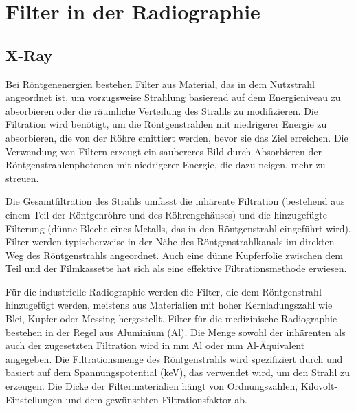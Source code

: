 \section{Filter in der Radiographie}
\subsection{X-Ray}

Bei Röntgenenergien bestehen Filter aus Material, das in dem Nutzstrahl angeordnet ist, um vorzugsweise Strahlung basierend auf dem Energieniveau zu absorbieren oder die räumliche Verteilung des Strahls zu modifizieren. Die Filtration wird benötigt, um die Röntgenstrahlen mit niedrigerer Energie zu absorbieren, die von der Röhre emittiert werden, bevor sie das Ziel erreichen. Die Verwendung von Filtern erzeugt ein saubereres Bild durch Absorbieren der Röntgenstrahlenphotonen mit niedrigerer Energie, die dazu neigen, mehr zu streuen.

Die Gesamtfiltration des Strahls umfasst die inhärente Filtration (bestehend aus einem Teil der Röntgenröhre und des Röhrengehäuses) und die hinzugefügte Filterung (dünne Bleche eines Metalls, das in den Röntgenstrahl eingeführt wird). Filter werden typischerweise in der Nähe des Röntgenstrahlkanals im direkten Weg des Röntgenstrahls angeordnet. Auch eine dünne Kupferfolie zwischen dem Teil und der Filmkassette hat sich als eine effektive Filtrationsmethode erwiesen.

Für die industrielle Radiographie werden die Filter, die dem Röntgenstrahl hinzugefügt werden, meistens aus Materialien mit hoher Kernladungszahl wie Blei, Kupfer oder Messing hergestellt. Filter für die medizinische Radiographie bestehen in der Regel aus Aluminium (Al). Die Menge sowohl der inhärenten als auch der zugesetzten Filtration wird in mm Al oder mm Al-Äquivalent angegeben. Die Filtrationsmenge des Röntgenstrahls wird spezifiziert durch und basiert auf dem Spannungspotential (keV), das verwendet wird, um den Strahl zu erzeugen. Die Dicke der Filtermaterialien hängt von Ordnungszahlen, Kilovolt-Einstellungen und dem gewünschten Filtrationsfaktor ab.

